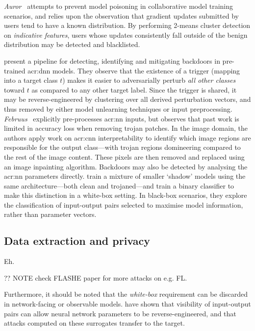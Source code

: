 \emph{Auror}~\parencite{DBLP:conf/acsac/ShenTS16} attempts to prevent model poisoning in collaborative model training scenarios, and relies upon the observation that gradient updates submitted by users tend to have a known distribution.
By performing 2-means cluster detection on \emph{indicative features}, users whose updates consistently fall outside of the benign distribution may be detected and blacklisted.

\Textcite{DBLP:conf/sp/WangYSLVZZ19} present a pipeline for detecting, identifying and mitigating backdoors in pre-trained \gls{acr:dnn} models.
They observe that the existence of a trigger (mapping into a target class $t$) makes it easier to adversarially perturb \emph{all other classes} toward $t$ as compared to any other target label.
Since the trigger is shared, it may be reverse-engineered by clustering over all derived perturbation vectors, and thus removed by either model unlearning techniques or input preprocessing.
\emph{Februus}~\parencite{DBLP:conf/acsac/DoanAR20} explicitly pre-processes \gls{acr:nn} inputs, but observes that past work is limited in accuracy loss when removing trojan patches.
In the image domain, the authors apply work on \gls{acr:cnn} interpretability to identify which image regions are responsible for the output class---with trojan regions domineering compared to the rest of the image content.
These pixels are then removed and replaced using an image inpainting algorithm.
Backdoors may also be detected by analysing the \gls{acr:nn} parameters directly.
\Textcite{DBLP:conf/sp/XuWLBGL21} train a mixture of smaller `shadow' models using the same architecture---both clean and trojaned---and train a binary classifier to make this distinction in a white-box setting.
In black-box scenarios, they explore the classification of input-output pairs selected to maximise model information, rather than parameter vectors.

\subsection{Data extraction and privacy}\label{sec:data-extraction-and-privacy}
Eh.

?? NOTE check FLASHE paper for more attacks on e.g. FL.

Furthermore, it should be noted that the \emph{white-box} requirement can be discarded in network-facing or observable models.
\textcite{DBLP:conf/uss/TramerZJRR16,DBLP:conf/uss/JagielskiCBKP20} have shown that visibility of input-output pairs can allow neural network parameters to be reverse-engineered, and that attacks computed on these surrogates transfer to the target.

